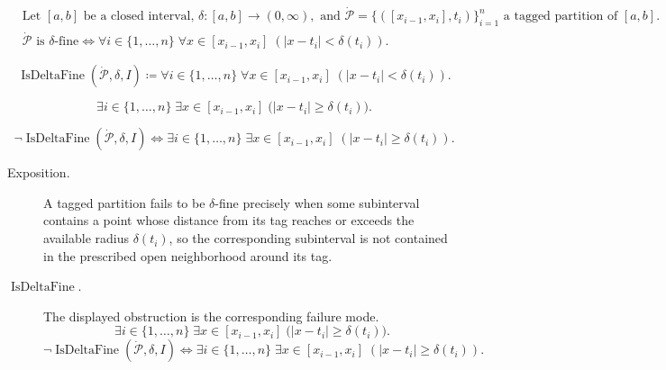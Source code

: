 \begin{remark*}
\[
\begin{aligned}
&\text{Let } [a,b] \text{ be a closed interval, } \delta:[a,b]\to(0,\infty), \text{ and } \dot{\mathcal{P}}=\{([x_{i-1},x_i],t_i)\}_{i=1}^n \text{ a tagged partition of } [a,b].\\
&\dot{\mathcal{P}} \text{ is }\delta\text{-fine} \Longleftrightarrow \forall i \in \{1,\dots,n\}\;\forall x \in [x_{i-1},x_i]\;( |x-t_i|<\delta(t_i)).
\end{aligned}
\]
\end{remark*}

\begin{remark*}
\[
\operatorname{IsDeltaFine}(\dot{\mathcal{P}},\delta,I) \coloneqq \forall i \in \{1,\dots,n\}\;\forall x \in [x_{i-1},x_i]\;( |x-t_i|<\delta(t_i)).
\]
\end{remark*}

\begin{remark*}
\[
\exists i \in \{1,\dots,n\}\;\exists x \in [x_{i-1},x_i]\;
\bigl(|x-t_i|\ge \delta(t_i)\bigr).
\]
\end{remark*}

\begin{remark*}
\[
\neg \operatorname{IsDeltaFine}(\dot{\mathcal{P}},\delta,I) \Longleftrightarrow \exists i \in \{1,\dots,n\}\;\exists x \in [x_{i-1},x_i]\;( |x-t_i|\ge \delta(t_i)).
\]
\end{remark*}

\begin{remark*}
\begin{description}
  \item[Exposition.]
A tagged partition fails to be $\delta$-fine precisely when some subinterval contains a point whose distance from its tag reaches or exceeds the available radius $\delta(t_i)$, so the corresponding subinterval is not contained in the prescribed open neighborhood around its tag.


  \item[\(\operatorname{IsDeltaFine}.\)]
  The displayed obstruction is the corresponding failure mode.
  \[
\exists i \in \{1,\dots,n\}\;\exists x \in [x_{i-1},x_i]\;
\bigl(|x-t_i|\ge \delta(t_i)\bigr).
  \]
  \[
\neg \operatorname{IsDeltaFine}(\dot{\mathcal{P}},\delta,I) \Longleftrightarrow \exists i \in \{1,\dots,n\}\;\exists x \in [x_{i-1},x_i]\;( |x-t_i|\ge \delta(t_i)).
  \]
\end{description}
\end{remark*}

